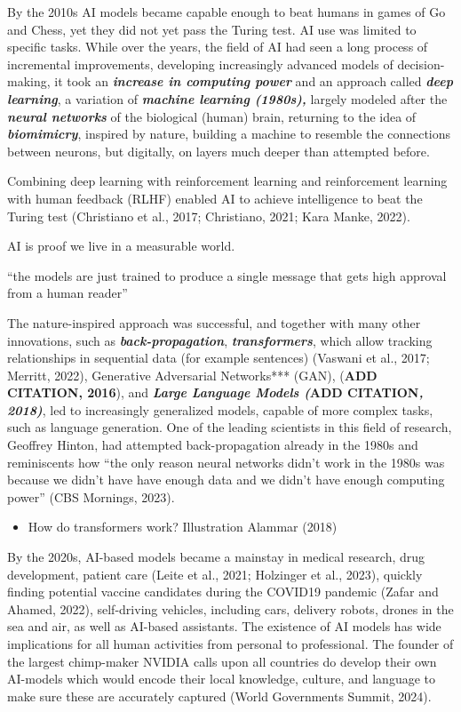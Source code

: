 \documentclass[
  letterpaper,
  DIV=11,
  numbers=noendperiod]{scrartcl}
\providecommand{\tightlist}{%
  \setlength{\itemsep}{0pt}\setlength{\parskip}{0pt}}\usepackage{longtable,booktabs,array}
\begin{document}
By the 2010s AI models became capable enough to beat humans in games of
Go and Chess, yet they did not yet pass the Turing test. AI use was
limited to specific tasks. While over the years, the field of AI had
seen a long process of incremental improvements, developing increasingly
advanced models of decision-making, it took an \textbf{\emph{increase in
computing power}} and an approach called \textbf{\emph{deep learning}},
a variation of \textbf{\emph{machine learning (1980s),}} largely modeled
after the \textbf{\emph{neural networks}} of the biological (human)
brain, returning to the idea of \textbf{\emph{biomimicry}}, inspired by
nature, building a machine to resemble the connections between neurons,
but digitally, on layers much deeper than attempted before.

Combining deep learning with reinforcement learning and reinforcement
learning with human feedback (RLHF) enabled AI to achieve intelligence
to beat the Turing test (Christiano et al., 2017; Christiano, 2021; Kara
Manke, 2022).

AI is proof we live in a measurable world.

``the models are just trained to produce a single message that gets high
approval from a human reader''

The nature-inspired approach was successful, and together with many
other innovations, such as \textbf{\emph{back-propagation}},
\textbf{\emph{transformers}}, which allow tracking relationships in
sequential data (for example sentences) (Vaswani et al., 2017; Merritt,
2022), Generative Adversarial Networks*** (GAN), (\textbf{ADD CITATION,
2016}), and \textbf{\emph{Large Language Models (}ADD CITATION\emph{,
2018)}}, led to increasingly generalized models, capable of more complex
tasks, such as language generation. One of the leading scientists in
this field of research, Geoffrey Hinton, had attempted back-propagation
already in the 1980s and reminiscents how ``the only reason neural
networks didn't work in the 1980s was because we didn't have have enough
data and we didn't have enough computing power'' (CBS Mornings, 2023).

\begin{itemize}
\tightlist
\item
  How do transformers work? Illustration Alammar (2018)
\end{itemize}

By the 2020s, AI-based models became a mainstay in medical research,
drug development, patient care (Leite et al., 2021; Holzinger et al.,
2023), quickly finding potential vaccine candidates during the COVID19
pandemic (Zafar and Ahamed, 2022), self-driving vehicles, including
cars, delivery robots, drones in the sea and air, as well as AI-based
assistants. The existence of AI models has wide implications for all
human activities from personal to professional. The founder of the
largest chimp-maker NVIDIA calls upon all countries do develop their own
AI-models which would encode their local knowledge, culture, and
language to make sure these are accurately captured (World Governments
Summit, 2024).
\end{document}
